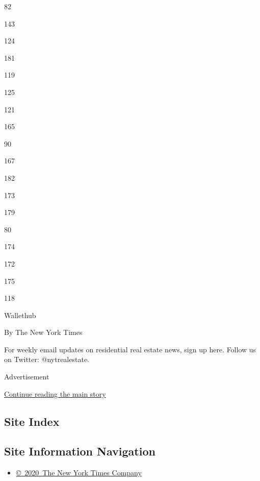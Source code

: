 82

143

124

181

119

125

121

165

90

167

182

173

179

80

174

172

175

118

Wallethub

By The New York Times

For weekly email updates on residential real estate news, sign up here.
Follow us on Twitter: @nytrealestate.

Advertisement

\protect\hyperlink{after-bottom}{Continue reading the main story}

\hypertarget{site-index}{%
\subsection{Site Index}\label{site-index}}

\hypertarget{site-information-navigation}{%
\subsection{Site Information
Navigation}\label{site-information-navigation}}

\begin{itemize}
\tightlist
\item
  \href{https://help.nytimes3xbfgragh.onion/hc/en-us/articles/115014792127-Copyright-notice}{©~2020~The
  New York Times Company}
\end{itemize}

